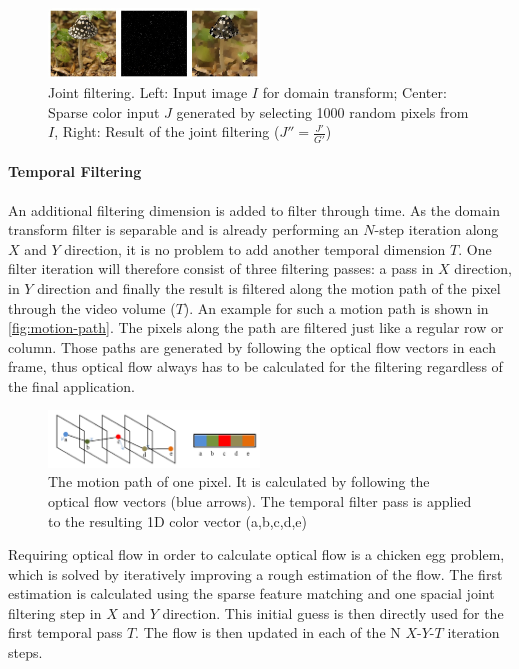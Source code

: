 \begin{figure}[h!]
  \centering
  \includegraphics[width=0.5\textwidth]{images/joint-filter.jpg}
  \caption{Joint filtering. Left: Input image $I$ for domain transform; Center: Sparse
  color input $J$ generated by selecting 1000 random pixels from $I$, Right:
  Result of the joint filtering ($J''=\frac{J'}{G'}$)}
  \label{fig:joint-filter}
\end{figure}

\paragraph{Temporal Filtering} \label{temporal-filtering}
An additional filtering dimension is added to filter through time. As the domain
transform filter is separable and is already performing an $N$-step iteration
along $X$ and $Y$ direction, it is no problem to add another temporal dimension
$T$. One filter iteration will therefore consist of three filtering passes: a
pass in $X$ direction, in $Y$ direction and finally the result is filtered along
the motion path of the pixel through the video volume ($T$). An example for such
a motion path is shown in \autoref{fig:motion-path}. The pixels along the path
are filtered just like a regular row or column. Those paths are generated by
following the optical flow vectors in each frame, thus optical flow always has
to be calculated for the filtering regardless of the final application. 

\begin{figure}[htb]
  \centering
  \includegraphics[width=0.5\textwidth]{images/paths.png}
  \caption{The motion path of one pixel. It is calculated by following the
  optical flow vectors (blue arrows). The temporal filter pass is applied to the
resulting 1D color vector (a,b,c,d,e)}
  \label{fig:motion-path}
\end{figure}

Requiring optical flow in order to calculate optical flow is a chicken egg
problem, which is solved by iteratively improving a rough estimation of the
flow. The first estimation is calculated using the sparse feature matching and
one spacial joint filtering step in $X$ and $Y$ direction. This initial guess is
then directly used for the first temporal pass $T$. The flow is then updated in
each of the N $X$-$Y$-$T$ iteration steps.


